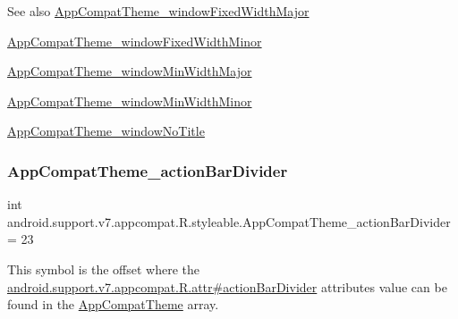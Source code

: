 \begin{DoxySeeAlso}{See also}
\hyperlink{classandroid_1_1support_1_1v7_1_1appcompat_1_1R_1_1styleable_aa1e116caa12a145c67596dd4910cfd53}{App\+Compat\+Theme\+\_\+window\+Fixed\+Width\+Major} 

\hyperlink{classandroid_1_1support_1_1v7_1_1appcompat_1_1R_1_1styleable_a373701a9ce98e38b9d2527222d764011}{App\+Compat\+Theme\+\_\+window\+Fixed\+Width\+Minor} 

\hyperlink{classandroid_1_1support_1_1v7_1_1appcompat_1_1R_1_1styleable_afd626a38693cbcfdd8ac1d5ff7c02a96}{App\+Compat\+Theme\+\_\+window\+Min\+Width\+Major} 

\hyperlink{classandroid_1_1support_1_1v7_1_1appcompat_1_1R_1_1styleable_a907f4aa44d62f6a4a0f50520dea3f4f1}{App\+Compat\+Theme\+\_\+window\+Min\+Width\+Minor} 

\hyperlink{classandroid_1_1support_1_1v7_1_1appcompat_1_1R_1_1styleable_a3d6aa74951e0bed5e26ea58ec3e818f6}{App\+Compat\+Theme\+\_\+window\+No\+Title} 
\end{DoxySeeAlso}
\mbox{\label{classandroid_1_1support_1_1v7_1_1appcompat_1_1R_1_1styleable_a2d926b280f2f1a0f939bb5cf4a225345}} 
\subsubsection{\texorpdfstring{App\+Compat\+Theme\+\_\+action\+Bar\+Divider}{AppCompatTheme\_actionBarDivider}}
{\footnotesize\ttfamily int android.\+support.\+v7.\+appcompat.\+R.\+styleable.\+App\+Compat\+Theme\+\_\+action\+Bar\+Divider = 23\hspace{0.3cm}{\ttfamily [static]}}

This symbol is the offset where the \hyperlink{classandroid_1_1support_1_1v7_1_1appcompat_1_1R_1_1attr_acffa48b16d0a323e2269b6253d3706b6}{android.\+support.\+v7.\+appcompat.\+R.\+attr\#action\+Bar\+Divider} attribute\textquotesingle{}s value can be found in the \hyperlink{classandroid_1_1support_1_1v7_1_1appcompat_1_1R_1_1styleable_a5c42f89e8a410c323be34208d75c430b}{App\+Compat\+Theme} array.

